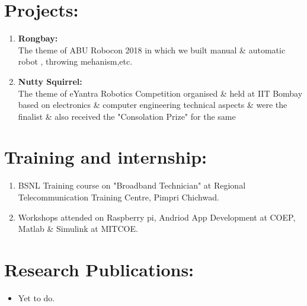 \documentclass[margin,line]{res}
\begin{document}
\begin{resume}
\hfill 

\section{\bf{\Large{Projects:}}}
\begin{enumerate}
	\item{{\textbf{\large{Rongbay:}}}\\ 
		The theme of ABU Robocon 2018 in which we built manual \& automatic robot , throwing 					mehanism,etc.}


	\item{{\textbf{\large{Nutty Squirrel:}}}\\ The theme of eYantra Robotics Competition organised \& held at IIT Bombay based on electronics \& computer engineering technical aspects \& were the finalist \& also received the "Consolation Prize" for the same }


\end{enumerate}
\hfill



{\section{\Large\bf{Training and internship:}}}
\begin{enumerate}
\vspace{1cm}
	\item{BSNL Training course on "Broadband Technician" at Regional Telecommunication Training Centre, Pimpri Chichwad. }	

	\item{ Workshops attended on Raspberry pi, Andriod App Development at COEP, Matlab \& Simulink 			at MITCOE. }	
\end{enumerate}
\hfill

{\section{\Large\bf{Research Publications:}}}
\begin{itemize}
	\item{Yet to do.}	
\end{itemize}
\hfill







\end{resume}
\end{document}
